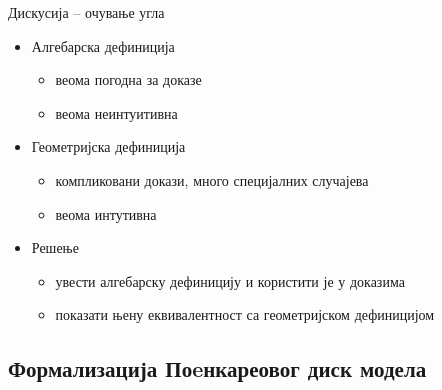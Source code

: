 \documentclass[slidestop, compress, mathserif, containsverbatim, xcolor=dvipsnames]{beamer}
\begin{document}
\begin{frame}{Дискусија -- очување угла}
  \begin{itemize}
  \item Алгебарска дефиниција
    \begin{itemize}
    \item веома погодна за доказе
    \item веома неинтуитивна
    \end{itemize}
  \item Геометријска дефиниција
    \begin{itemize}
    \item компликовани докази, много специјалних случајева
    \item веома интутивна
    \end{itemize}
  \item Решење
    \begin{itemize}
    \item увести алгебарску дефиницију и користити је у доказима
    \item показати њену еквивалентност са геометријском дефиницијом
    \end{itemize}
  \end{itemize}
\end{frame}

\subsection*{Формализација Поeнкареовог диск модела}
\end{document}
